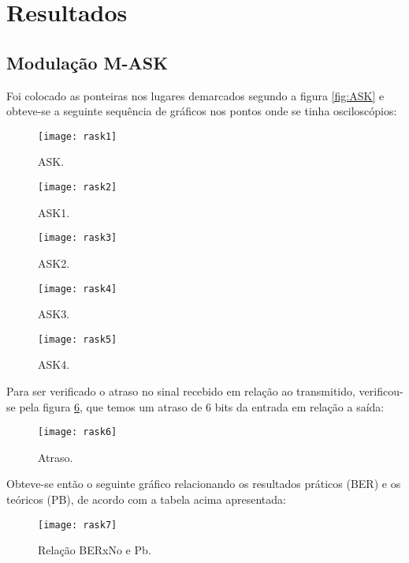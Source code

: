 \newpage
\section{Resultados}

\subsection{Modulação M-ASK}
Foi colocado as ponteiras nos lugares demarcados segundo a figura \ref{fig:ASK} e obteve-se a seguinte sequência de gráficos nos pontos onde se tinha osciloscópios:

\begin{figure}[H]
    \centering
    \texttt{[image: rask1]}
    \caption{ASK.}
    \label{fig:rask1}
\end{figure}

\begin{figure}[H]
    \centering
    \texttt{[image: rask2]}
    \caption{ASK1.}
    \label{fig:rask2}
\end{figure}

\begin{figure}[H]
    \centering
    \texttt{[image: rask3]}
    \caption{ASK2.}
    \label{fig:rask3}
\end{figure}

\begin{figure}[H]
    \centering
    \texttt{[image: rask4]}
    \caption{ASK3.}
    \label{fig:rask4}
\end{figure}

\begin{figure}[H]
    \centering
    \texttt{[image: rask5]}
    \caption{ASK4.}
    \label{fig:rask5}
\end{figure}

Para ser verificado o atraso no sinal recebido em relação ao transmitido, verificou-se pela figura \ref{fig:rask6}, que temos um atraso de 6 bits da entrada em relação a saída:
\begin{figure}[H]
    \centering
    \texttt{[image: rask6]}
    \caption{Atraso.}
    \label{fig:rask6}
\end{figure}


Obteve-se então o seguinte gráfico relacionando os resultados práticos (BER) e os teóricos (PB), de acordo com a tabela acima apresentada:

\begin{figure}[H]
    \centering
    \texttt{[image: rask7]}
    \caption{Relação BERxNo e Pb.}
    \label{fig:rask7}
\end{figure}

